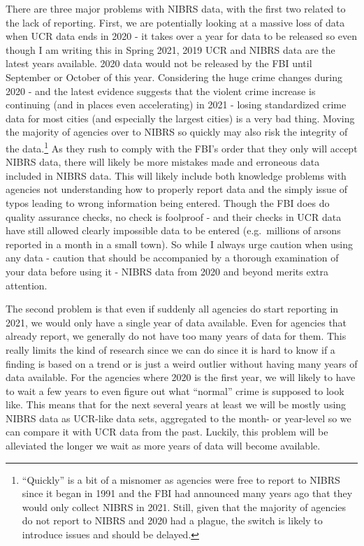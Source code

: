 \documentclass[
]{krantz}
\begin{document}
There are three major problems with NIBRS data, with the
first two related to the lack of reporting. First, we are
potentially looking at a massive loss of data when UCR data
ends in 2020 - it takes over a year for data to be released
so even though I am writing this in Spring 2021, 2019 UCR
and NIBRS data are the latest years available. 2020 data
would not be released by the FBI until September or October
of this year. Considering the huge crime changes during 2020
- and the latest evidence suggests that the violent crime
increase is continuing (and in places even accelerating) in
2021 - losing standardized crime data for most cities (and
especially the largest cities) is a very bad thing. Moving
the majority of agencies over to NIBRS so quickly may also
risk the integrity of the data.\footnote{``Quickly'' is a
  bit of a misnomer as agencies were free to report to NIBRS
  since it began in 1991 and the FBI had announced many
  years ago that they would only collect NIBRS in 2021.
  Still, given that the majority of agencies do not report
  to NIBRS and 2020 had a plague, the switch is likely to
  introduce issues and should be delayed.} As they rush to
comply with the FBI's order that they only will accept NIBRS
data, there will likely be more mistakes made and erroneous
data included in NIBRS data. This will likely include both
knowledge problems with agencies not understanding how to
properly report data and the simply issue of typos leading
to wrong information being entered. Though the FBI does do
quality assurance checks, no check is foolproof - and their
checks in UCR data have still allowed clearly impossible
data to be entered (e.g.~millions of arsons reported in a
month in a small town). So while I always urge caution when
using any data - caution that should be accompanied by a
thorough examination of your data before using it - NIBRS
data from 2020 and beyond merits extra attention.

The second problem is that even if suddenly all agencies do
start reporting in 2021, we would only have a single year of
data available. Even for agencies that already report, we
generally do not have too many years of data for them. This
really limits the kind of research since we can do since it
is hard to know if a finding is based on a trend or is just
a weird outlier without having many years of data available.
For the agencies where 2020 is the first year, we will
likely to have to wait a few years to even figure out what
``normal'' crime is supposed to look like. This means that
for the next several years at least we will be mostly using
NIBRS data as UCR-like data sets, aggregated to the month- or
year-level so we can compare it with UCR data from the past.
Luckily, this problem will be alleviated the longer we wait
as more years of data will become available.
\end{document}
